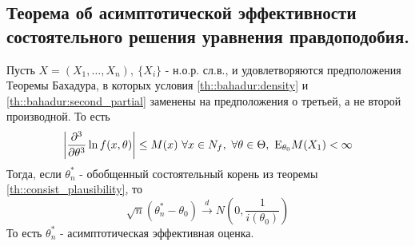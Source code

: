 \subsection{Теорема об асимптотической эффективности состоятельного решения уравнения правдоподобия.}
\begin{theorem}
    \label{th::asympt_consist}
    Пусть \(X = (X_1, \ldots, X_n),\ \{X_i\}\) - н.о.р. сл.в., и
    удовлетворяются предположения Теоремы Бахадура, в которых условия
    \ref{th::bahadur:density} и \ref{th::bahadur:second_partial} заменены на
    предположения о третьей, а не второй производной. То есть
    \[\left\lvert \frac{\partial^3}{\partial \theta^3} \ln f(x, \theta) \right\rvert  \leq M(x) \ \forall x\in N_f,\ \forall\theta\in\Theta,\ \E_{\theta_0}M(X_1) < \infty\]
    Тогда, если \(\theta^*_n\) - обобщенный состоятельный корень из теоремы \ref{th::consist_plausibility}, то
    \[\sqrt{n}(\theta^*_n - \theta_0) \xrightarrow{d} N\left(0, \frac{1}{i(\theta_0)}\right)\]
    То есть \(\theta^*_n\) - асимптотическая эффективная оценка.
\end{theorem}
